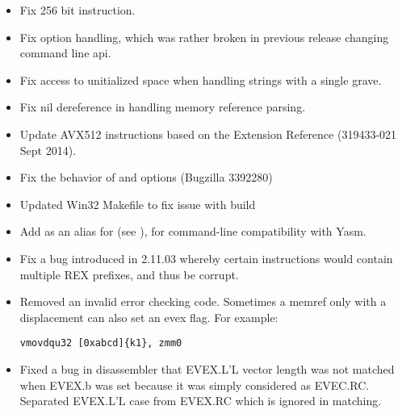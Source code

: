 \begin{itemize}
    \item{Fix 256 bit  instruction.}

    \item{Fix  option handling, which was rather broken in previous
        release changing command line api.}

    \item{Fix access to unitialized space when handling strings with
        a single grave.}

    \item{Fix nil dereference in handling memory reference parsing.}
\end{itemize}


\begin{itemize}
    \item{Update AVX512 instructions based on the Extension Reference (319433-021 Sept 2014).}
    \item{Fix the behavior of  and  options (Bugzilla 3392280)}
    \item{Updated Win32 Makefile to fix issue with build}
\end{itemize}


\begin{itemize}
    \item{Add  as an alias for  (see ), for
        command-line compatibility with Yasm.}
    \item{Fix a bug introduced in 2.11.03 whereby certain instructions would
        contain multiple REX prefixes, and thus be corrupt.}
\end{itemize}


\begin{itemize}
    \item{Removed an invalid error checking code. Sometimes a memref only with
        a displacement can also set an evex flag. For example:
\begin{lstlisting}
vmovdqu32 [0xabcd]{k1}, zmm0
\end{lstlisting}}

    \item{Fixed a bug in disassembler that EVEX.L'L vector length was not matched
        when EVEX.b was set because it was simply considered as EVEC.RC.
        Separated EVEX.L'L case from EVEX.RC which is ignored in matching.}
\end{itemize}

